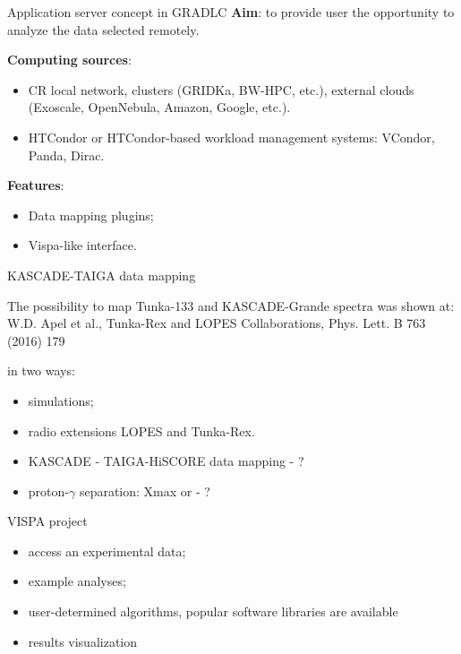 
\begin{frame}{Application server concept in GRADLC}
\textbf{Aim}: to provide user the opportunity to analyze the data selected remotely.
\vspace{\itemsep}

\textbf{Computing sources}:
  \begin{itemize}
    \item CR local network, clusters (GRIDKa, BW-HPC, etc.), external clouds (Exoscale, OpenNebula, Amazon, Google, etc.).
    \item HTCondor or HTCondor-based workload management systems: VCondor, Panda, Dirac.
  \end{itemize}
\vspace{\itemsep}

\textbf{Features}:
  \begin{itemize}
    \item Data mapping plugins;
    \item Vispa-like interface.
  \end{itemize}
\end{frame}


\begin{frame}{KASCADE-TAIGA data mapping}

The possibility to map Tunka-133 and KASCADE-Grande spectra was shown at:
W.D. Apel et al., Tunka-Rex and LOPES Collaborations, Phys. Lett. B 763 (2016)
179

in two ways:

\begin{itemize}
 \item simulations;
 \item radio extensions LOPES and Tunka-Rex.
\end{itemize}

\begin{itemize}
 \item KASCADE - TAIGA-HiSCORE data mapping - ?
 \item proton-$\gamma$ separation: Xmax or - ?
\end{itemize}

\end{frame}


\begin{frame}{VISPA project}
\begin{itemize}
 \item access an experimental data;
 \item example analyses;
 \item user-determined algorithms, popular software libraries are available
 \item results visualization
\end{itemize}

\end{frame}



